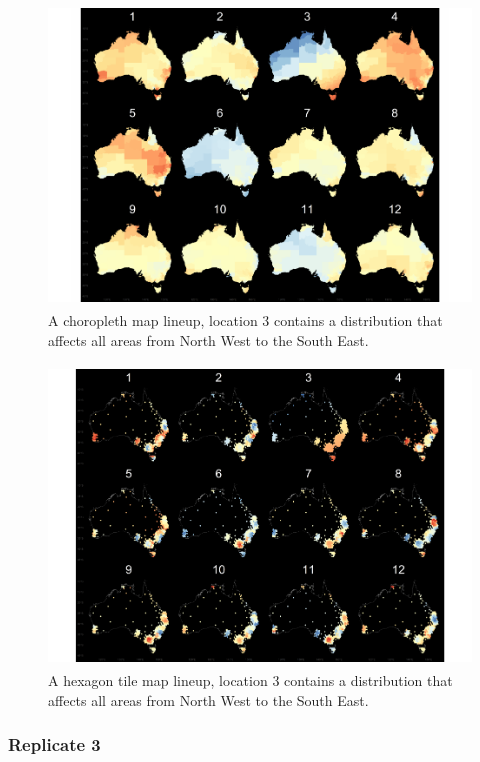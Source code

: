 \documentclass{monashthesis}
\begin{document}
\begin{figure}[H]
\centering
\includegraphics[height=8cm]{lineups/nwse-geo3-1.pdf}
\caption{\label{fig:nwse-geo3}A choropleth map lineup, location 3 contains a distribution that affects all areas from North West to the South East.}
\end{figure}

\begin{figure}[H]
\centering
\includegraphics[height=8cm]{lineups/nwse-hex3-1.pdf}
\caption{\label{fig:nwse-hex3}A hexagon tile map lineup, location 3 contains a distribution that affects all areas from North West to the South East.}
\end{figure}

\hypertarget{replicate-3-2}{%
\subsubsection{Replicate 3}\label{replicate-3-2}}
\end{document}
